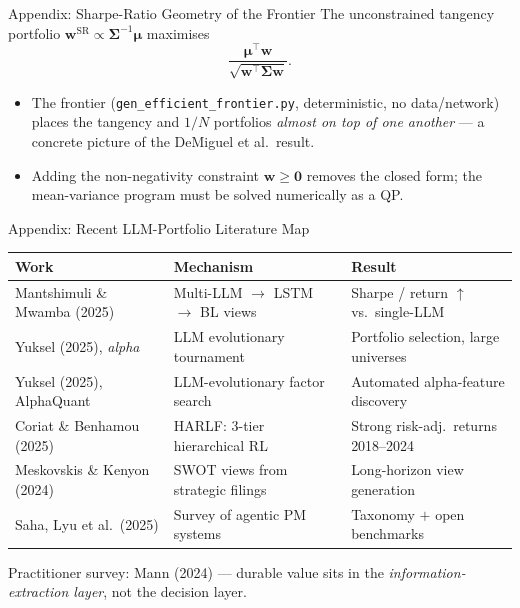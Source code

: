 \documentclass[9pt,t]{beamer}
\begin{document}

\begin{frame}[noframenumbering]{Appendix: Sharpe-Ratio Geometry of the Frontier}
The unconstrained tangency portfolio $\mathbf{w}^{\text{SR}}\propto\boldsymbol{\Sigma}^{-1}\boldsymbol{\mu}$
maximises
\[
\frac{\boldsymbol{\mu}^\top\mathbf{w}}{\sqrt{\mathbf{w}^\top\boldsymbol{\Sigma}\mathbf{w}}}.
\]
\begin{itemize}
  \item The frontier (\texttt{gen\_efficient\_frontier.py}, deterministic, no data/network)
        places the tangency and $1/N$ portfolios \emph{almost on top of one another} ---
        a concrete picture of the DeMiguel et al.\ result.
  \item Adding the non-negativity constraint $\mathbf{w}\ge\mathbf{0}$ removes the closed form;
        the mean-variance program must be solved numerically as a QP.
\end{itemize}
\end{frame}

\begin{frame}[noframenumbering]{Appendix: Recent LLM-Portfolio Literature Map}
\small
\begin{tabular}{lll}
\toprule
\textbf{Work} & \textbf{Mechanism} & \textbf{Result} \\
\midrule
Mantshimuli \& Mwamba (2025) & Multi-LLM $\to$ LSTM $\to$ BL views & Sharpe / return $\uparrow$ vs.\ single-LLM \\
Yuksel (2025), \emph{alpha}  & LLM evolutionary tournament       & Portfolio selection, large universes \\
Yuksel (2025), AlphaQuant    & LLM-evolutionary factor search    & Automated alpha-feature discovery \\
Coriat \& Benhamou (2025)    & HARLF: 3-tier hierarchical RL     & Strong risk-adj.\ returns 2018--2024 \\
Meskovskis \& Kenyon (2024)  & SWOT views from strategic filings & Long-horizon view generation \\
Saha, Lyu et al.\ (2025)     & Survey of agentic PM systems      & Taxonomy $+$ open benchmarks \\
\bottomrule
\end{tabular}

\medskip
\normalsize Practitioner survey: Mann (2024) --- durable value sits in the
\emph{information-extraction layer}, not the decision layer.
\end{frame}
\end{document}
